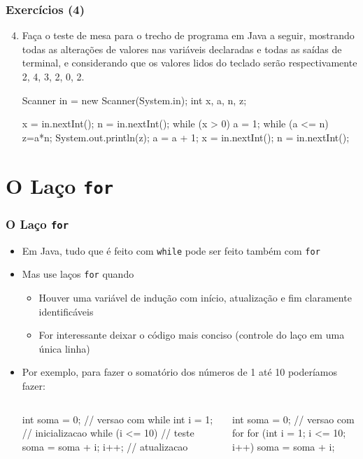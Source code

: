 \documentclass[xcolor={dvipsnames,table},aspectratio=169]{beamer}
\begin{document}
\begin{frame}[fragile]\frametitle{Exercícios (4)}
\begin{enumerate}
	\setcounter{enumi}{3}
	\item Faça o teste de mesa para o trecho de programa em Java a seguir, mostrando todas as alterações de valores nas variáveis declaradas e todas as saídas de terminal, e considerando que os valores lidos do teclado serão respectivamente 2, 4, 3, 2, 0, 2.\\
{\scriptsize
\begin{javacode}
Scanner in = new Scanner(System.in);
int x, a, n, z;

x = in.nextInt();
n = in.nextInt();
while (x > 0) {
   a = 1;
   while (a <= n) {
      z=a*n;
      System.out.println(z);
      a = a + 1;
   }
   x = in.nextInt();
   n = in.nextInt();
}
\end{javacode}
}
\end{enumerate}	
\end{frame}

\section{O Laço \texttt{for}}

\begin{frame}[fragile]\frametitle{O Laço \texttt{for}}
\begin{itemize}
    \item Em Java, tudo que é feito com \texttt{while} pode ser feito também com \texttt{for}
    \item Mas use laços \texttt{for} quando 
	\begin{itemize}
		\item Houver uma variável de indução com início, atualização e fim claramente identificáveis
		\item For interessante deixar o código mais conciso (controle do laço em uma única linha)
	\end{itemize}
	\item Por exemplo, para fazer o somatório dos números de 1 até 10 poderíamos fazer:
	
\begin{columns}[T]
	\begin{column}{0.5\linewidth}
{\scriptsize
\begin{javacode}
int soma = 0;
// versao com while
int i = 1;  // inicializacao
while (i <= 10)  { // teste
   soma = soma + i;
   i++; // atualizacao
}
\end{javacode}
}
	\end{column}
	\begin{column}{0.5\linewidth}
{\scriptsize
\begin{javacode}
int soma = 0;
// versao com for
for (int i = 1; i <= 10; i++) {
   soma = soma + i;
}
\end{javacode}
}
\end{column}
\end{columns}
\end{itemize}
\end{frame}
\end{document}
